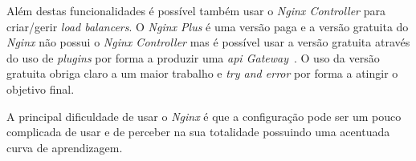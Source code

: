 Além destas funcionalidades é possível também usar o \textit{Nginx Controller} para criar/gerir \textit{load balancers}. O \textit{Nginx Plus} é uma versão paga e a versão gratuita do \textit{Nginx} não possui o \textit{Nginx Controller} mas é possível usar a versão gratuita através do uso de \textit{plugins} por forma a produzir uma \textit{\acrshort{api} Gateway}~\cite{compAPIGat}. O uso da versão gratuita obriga claro a um maior trabalho e \textit{try and error} por forma a atingir o objetivo final.

A principal dificuldade de usar o \textit{Nginx} é que a configuração pode ser um pouco complicada de usar e de perceber na sua totalidade possuindo uma acentuada curva de aprendizagem.
